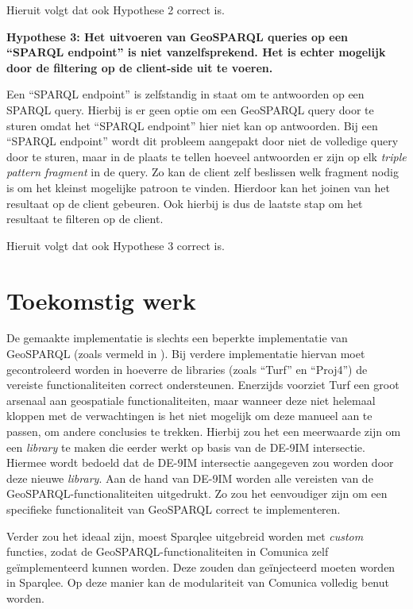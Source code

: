 Hieruit volgt dat ook Hypothese 2 correct is.

\textbf{Hypothese 3: Het uitvoeren van GeoSPARQL queries op een ``SPARQL endpoint'' is niet vanzelfsprekend. Het is echter mogelijk door de filtering op de client-side uit te voeren.}

Een ``SPARQL endpoint'' is zelfstandig in staat om te antwoorden op een SPARQL query. Hierbij is er geen optie om een GeoSPARQL query door te sturen omdat het ``SPARQL endpoint'' hier niet kan op antwoorden. Bij een ``SPARQL endpoint'' wordt dit probleem aangepakt door niet de volledige query door te sturen, maar in de plaats te tellen hoeveel antwoorden er zijn op elk \textit{triple pattern fragment} in de query. Zo kan de client zelf beslissen welk fragment nodig is om het kleinst mogelijke patroon te vinden. Hierdoor kan het joinen van het resultaat op de client gebeuren. Ook hierbij is dus de laatste stap om het resultaat te filteren op de client. 

Hieruit volgt dat ook Hypothese 3 correct is.

\section{Toekomstig werk}

De gemaakte implementatie is slechts een beperkte implementatie van GeoSPARQL (zoals vermeld in ). Bij verdere implementatie hiervan moet gecontroleerd worden in hoeverre de libraries (zoals ``Turf'' en ``Proj4'') de vereiste functionaliteiten correct ondersteunen. Enerzijds voorziet Turf een groot arsenaal aan geospatiale functionaliteiten, maar wanneer deze niet helemaal kloppen met de verwachtingen is het niet mogelijk om deze manueel aan te passen, om andere conclusies te trekken. Hierbij zou het een meerwaarde zijn om een \textit{library} te maken die eerder werkt op basis van de DE-9IM intersectie. Hiermee wordt bedoeld dat de DE-9IM intersectie aangegeven zou worden door deze nieuwe \textit{library}. Aan de hand van DE-9IM worden alle vereisten van de GeoSPARQL-functionaliteiten uitgedrukt. Zo zou het eenvoudiger zijn om een specifieke functionaliteit van GeoSPARQL correct te implementeren. 

Verder zou het ideaal zijn, moest Sparqlee uitgebreid worden met \textit{custom} functies, zodat de GeoSPARQL-functionaliteiten in Comunica zelf geïmplementeerd kunnen worden. Deze zouden dan geïnjecteerd moeten worden in Sparqlee. Op deze manier kan de modulariteit van Comunica volledig benut worden.

